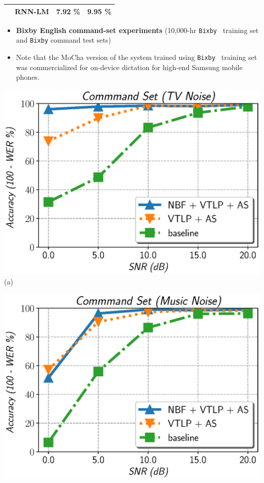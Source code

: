 \documentclass[a0,portrait]{a0poster}
\newenvironment{Figure}
  {\par\medskip\noindent\minipage{\linewidth}}
  {\endminipage\par\medskip}
\begin{document}
\begin{multicols}{2}
\begin{minipage}[b]{1.0\linewidth}
\begin{tabular}{| c | c  || c | c |}
                  & RNN-LM  &   7.92  \% &   9.95  \% \\
          \hline
       \end{tabular}
       \vspace{-2mm}
\end{minipage}
%
%
%
%
\begin{itemize}
\item \textbf{Bixby English command-set experiments} (10,000-hr {\tt Bixby } training set and {\tt Bixby} command test sets) \\
\item Note that the MoCha version of the system trained using  {\tt Bixby } training set was commercialized for on-device dictation for high-end Samsung mobile phones. \\
\end{itemize}
\begin{Figure}
  \captionsetup[subfigure]{justification=centering}
    \centering
    \begin{minipage}{0.49\textwidth}
			\centering
      {\includegraphics[width=175mm]{../figures/plot_farfield_wer_tv}}
			{(a)}	
    \end{minipage}
%
    \begin{minipage}{0.49\textwidth}
			\centering
      {\includegraphics[width=175mm]{../figures/plot_farfield_wer_music}}

\end{minipage}
\end{Figure}
\end{multicols}
\end{document}
